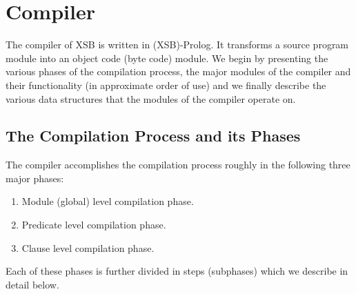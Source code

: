 \section{Compiler} \label{sec:compiler}

The compiler of XSB is written in (XSB)-Prolog. It transforms
a source program module into an object code (byte code) module.
We begin by presenting the various phases of the compilation
process, the major modules of the compiler and their functionality
(in approximate order of use) and we finally describe the various
data structures that the modules of the compiler operate on.

\subsection{The Compilation Process and its Phases}
The compiler accomplishes the compilation process roughly in the
following three major phases:
\begin{enumerate}
\item	Module (global) level compilation phase.
\item	Predicate level compilation phase.
\item	Clause level compilation phase.
\end{enumerate}

Each of these phases is further divided in steps (subphases) 
which we describe in detail below.

